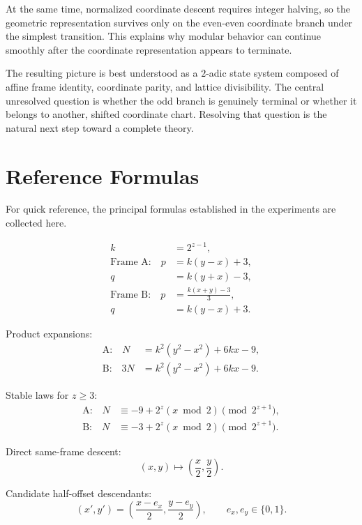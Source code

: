 \documentclass[11pt,a4paper]{article}
\theoremstyle{definition}
\theoremstyle{remark}
\begin{document}
At the same time, normalized coordinate descent requires integer halving, so the geometric representation survives only on the even-even coordinate branch under the simplest transition. This explains why modular behavior can continue smoothly after the coordinate representation appears to terminate.

The resulting picture is best understood as a $2$-adic state system composed of affine frame identity, coordinate parity, and lattice divisibility. The central unresolved question is whether the odd branch is genuinely terminal or whether it belongs to another, shifted coordinate chart. Resolving that question is the natural next step toward a complete theory.

\appendix
\section{Reference Formulas}

For quick reference, the principal formulas established in the experiments are collected here.

\begin{align*}
 k&=2^{z-1},\\[4pt]
 \text{Frame A:}\quad
 p&=k(y-x)+3,\\
 q&=k(y+x)-3,\\[4pt]
 \text{Frame B:}\quad
 p&=\frac{k(x+y)-3}{3},\\
 q&=k(y-x)+3.
\end{align*}

Product expansions:
\begin{align*}
 \text{A:}\quad
 N&=k^2(y^2-x^2)+6kx-9,\\
 \text{B:}\quad
 3N&=k^2(y^2-x^2)+6kx-9.
\end{align*}

Stable laws for $z\ge3$:
\begin{align*}
 \text{A:}\quad
 N&\equiv-9+2^z(x\bmod2)\pmod{2^{z+1}},\\
 \text{B:}\quad
 N&\equiv-3+2^z(x\bmod2)\pmod{2^{z+1}}.
\end{align*}

Direct same-frame descent:
\[
(x,y)\mapsto\left(\frac{x}{2},\frac{y}{2}\right).
\]

Candidate half-offset descendants:
\[
(x',y')=
\left(\frac{x-e_x}{2},
      \frac{y-e_y}{2}\right),
\qquad e_x,e_y\in\{0,1\}.
\]
\end{document}
